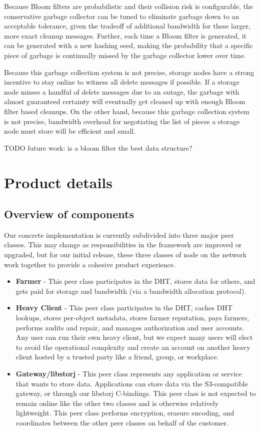 \documentclass[a4paper,10pt]{article} \usepackage[utf8]{inputenc}
\newcommand{\todo}[1]{{\color{red} TODO #1 }}
\begin{document}
Because Bloom filters are probabilistic and their collision risk is
configurable, the conservative garbage collector can be tuned to eliminate
garbage down to an acceptable tolerance, given the tradeoff of additional
bandwidth for these larger, more exact cleanup messages. Further, each time a
Bloom filter is generated, it can be generated with a new hashing seed, making
the probability that a specific piece of garbage is continually missed by the
garbage collector lower over time.

Because this garbage collection system is not precise, storage nodes have a
strong incentive to stay online to witness all delete messages if possible.
If a storage node misses a handful of delete messages due to an outage, the
garbage with almost guaranteed certainty will eventually get cleaned up with
enough Bloom filter based cleanups.
On the other hand, because this garbage collection system is not precise,
bandwidth overhead for negotiating the list of pieces a storage node must store
will be efficient and small.

\todo{future work: is a bloom filter the best data structure?}

\section{Product details}\label{sec:product_details}

\subsection{Overview of components}

Our concrete implementation is currently subdivided into three major peer
classes. This may change as responsibilities in the framework are improved or
upgraded, but for our initial release, these three classes of node on the
network work together to provide a cohesive product experience.

\begin{itemize}
\item {\bf Farmer} - This peer class participates in the DHT, stores data for
  others, and gets paid for storage and bandwidth (via a bandwidth allocation
  protocol).
\item {\bf Heavy Client} - This peer class participates in the DHT, caches
  DHT lookups, stores per-object metadata, stores farmer reputation, pays
  farmers, performs audits and repair, and manages authorization and user
  accounts. Any user can run their own heavy client, but we expect many users
  will elect to avoid the operational complexity and create an account on
  another heavy client hosted by a trusted party like a friend, group, or
  workplace.
\item {\bf Gateway/libstorj} - This peer class represents any application or
  service that wants to store data. Applications can store data via the
  S3-compatible gateway, or through our libstorj C-bindings. This peer class
  is not expected to remain online like the other two classes and is otherwise
  relatively lightweight. This peer class performs encryption, erasure encoding,
  and coordinates between the other peer classes on behalf of the customer.
\end{itemize}
\end{document}
